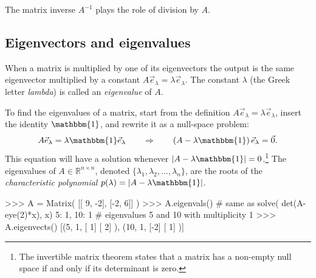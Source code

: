 \noindent
The matrix inverse $A^{-1}$ plays the role of division by $A$.


\vspace{-3mm}

\subsection{Eigenvectors and eigenvalues}
\label{matrices:eigenvectors_and_eigenvalues}

\vspace{-1mm}

		When a matrix is multiplied by one of its eigenvectors the output
		is the same eigenvector multiplied by a constant $A\vec{e}_\lambda =\lambda\vec{e}_\lambda$.
		The constant $\lambda$ (the Greek letter \emph{lambda}) is called an \emph{eigenvalue} of $A$.
		
		To find the eigenvalues of a matrix,  start from the definition $A\vec{e}_\lambda =\lambda\vec{e}_\lambda$,
		insert the identity $\mathbbm{1}$, 
		and rewrite it as a null-space problem:
		\[
			A\vec{e}_\lambda =\lambda\mathbbm{1}\vec{e}_\lambda
			\qquad
			\Rightarrow
			\qquad
			\left(A - \lambda\mathbbm{1}\right)\vec{e}_\lambda = \vec{0}.
		\]
		This equation will have a solution whenever $|A - \lambda\mathbbm{1}|=0$.\footnote{The invertible matrix theorem states
		that a matrix has a non-empty null space if and only if its determinant is zero.}
		The eigenvalues of $A \in \mathbb{R}^{n \times n}$, 
		denoted $\{ \lambda_1, \lambda_2, \ldots, \lambda_n \}$,
		are the roots of the \emph{characteristic polynomial} $p(\lambda)=|A - \lambda \mathbbm{1}|$.
		
		

\small
\begin{verbatimtab}
>>> A = Matrix( [[ 9, -2],
                 [-2,  6]] )
>>> A.eigenvals()   # same as  solve( det(A-eye(2)*x), x)
{5: 1, 10: 1}       # eigenvalues 5 and 10 with multiplicity 1
>>> A.eigenvects()   
[(5, 1, [ 1]  
        [ 2]  ),      (10, 1, [-2]
                              [ 1]  )]
\end{verbatimtab}
\normalsize

\noindent



